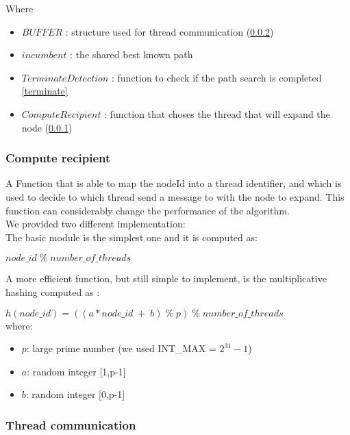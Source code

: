 Where
\begin{itemize}
    \item $BUFFER$ : structure used for thread communication (\ref{thread_buf})
    \item $incumbent$ : the shared best known path
    \item $TerminateDetection$ : function to check if the path search is completed \ref{terminate}
    \item $ComputeRecipient$ : function that choses the thread that will expand the node (\ref{compute_reci})
\end{itemize}

\subsubsection{Compute recipient}
\label{compute_reci}

A Function that is able to map the nodeId into a thread identifier, and which is used to decide to which thread send a message to with the node to expand.
This function can considerably change the performance of the algorithm.
\\ 
We provided two different implementation:
\\
The basic module is the simplest one and it is computed as: \\
\begin{center}
    $node\_id \; \% \;  number\_of\_threads$
\end{center}

A more efficient function, but still simple to implement, is the multiplicative hashing computed as \cite{bibVideoMulHash}: \\
\begin{center}
    $ h(node\_id) =((a*node\_id \; + \; b) \; \% \; p) \; \% \; number\_of\_threads $  
    \\ 
    where:
    \begin{itemize}
        \item $p$: large prime number (we used INT\_MAX =  $ 2^{31}-1 $)
        \item $a$: random integer [1,p-1]
        \item $b$: random integer [0,p-1]
    \end{itemize}
\end{center}


\subsubsection{Thread communication}
\label{thread_buf}

